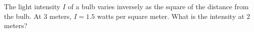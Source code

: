 The light intensity $I$ of a bulb varies inversely as the square of the distance from the bulb. At $3$ meters, $I=1.5$ watts per square meter. What is the intensity at $2$ meters?
